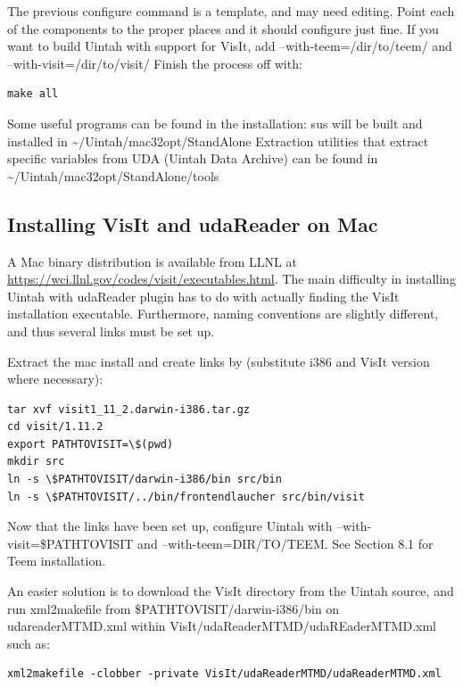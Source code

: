 \documentclass[12pt]{article}
\begin{document}
The previous configure command is a template, and may need editing.
Point each of the components to the proper places and it should
configure just fine.  If you want to build Uintah with support for
VisIt, add --with-teem=/dir/to/teem/ and --with-visit=/dir/to/visit/
Finish the process off with:

\begin{verbatim}
make all
\end{verbatim}
  

Some useful programs can be found in the installation: sus will be
built and installed in \textasciitilde/Uintah/mac32opt/StandAlone
Extraction utilities that extract specific variables from UDA (Uintah
Data Archive) can be found in
\textasciitilde/Uintah/mac32opt/StandAlone/tools

\subsection{Installing VisIt and udaReader on Mac}

A Mac binary distribution is available from LLNL at
\url{https://wci.llnl.gov/codes/visit/executables.html}.  The main
difficulty in installing Uintah with udaReader plugin has to do with
actually finding the VisIt installation executable.  Furthermore,
naming conventions are slightly different, and thus several links must
be set up.

Extract the mac install and create links by (substitute i386 and VisIt
version where necessary):

\begin{verbatim}
tar xvf visit1_11_2.darwin-i386.tar.gz
cd visit/1.11.2
export PATHTOVISIT=\$(pwd)
mkdir src
ln -s \$PATHTOVISIT/darwin-i386/bin src/bin
ln -s \$PATHTOVISIT/../bin/frontendlaucher src/bin/visit
\end{verbatim}

Now that the links have been set up, configure Uintah with
--with-visit=\$PATHTOVISIT and --with-teem=DIR/TO/TEEM.  See Section
8.1 for Teem installation.

An easier solution is to download the VisIt directory from the Uintah
source, and run xml2makefile from \$PATHTOVISIT/darwin-i386/bin on
udareaderMTMD.xml within VisIt/udaReaderMTMD/udaREaderMTMD.xml such
as:

\begin{verbatim}
xml2makefile -clobber -private VisIt/udaReaderMTMD/udaReaderMTMD.xml
\end{verbatim}
\end{document}
